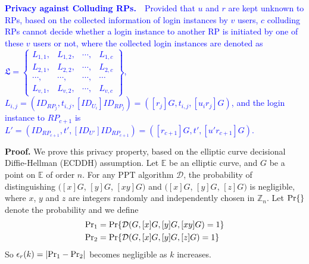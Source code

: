 {{\vspace{1mm}
\noindent\textcolor{blue}{\textbf{Privacy against Colluding RPs.}~~Provided that $u$ and $r$ are kept unknown to RPs,
based on the collected information of login instances by $v$ users,
$c$ colluding RPs cannot decide whether a login instance to another RP is initiated by one of these $v$ users or not,
    where
    the collected login instances are denoted as $\mathfrak{L}=\left\{ \begin{matrix}
L_{1,1}, & L_{1,2}, & \cdots, & L_{1,c}\\
L_{2,1}, & L_{2,2}, & \cdots, & L_{2,c}\\
\cdots, & \cdots, & \cdots, & \cdots\\
L_{v,1}, & L_{v,2}, & \cdots, & L_{v,c}
\end{matrix}\right\}$, $L_{i, j} = (ID_{RP_j}, t_{i, j}, [ID_{U_i}]{ID_{RP_j}}) = ([r_j]G, t_{i,j}, [u_ir_j]G)$,
    and the login instance to $RP_{c+1}$ is $L'=(ID_{RP_{c+1}}, t', [ID_{U'}]ID_{RP_{c+1}}) = ([r_{c+1}]G, t', [u'r_{c+1}]G)$.}


\vspace{0.75mm}
\noindent\textbf{Proof.}
We prove this privacy property,
 based on the elliptic curve decisional Diffie-Hellman (ECDDH) assumption. %
%
Let $\mathbb{E}$ be an elliptic curve,
    and $G$ be a point on $\mathbb{E}$ of order $n$.
For any PPT algorithm $\mathcal{D}$, the probability of distinguishing
 $([x]G$, $[y]G$, $[xy]G)$ and $([x]G$, $[y]G$, $[z]G)$
is negligible,
 where $x$, $y$ and $z$ are integers randomly and independently chosen in $\mathbb{Z}_n$.
Let  ${\rm Pr}\{\}$ denote the probability and
 we define
\begin{align*}
&{\rm Pr}_1 =  {\rm Pr}\{\mathcal{D}(G, [x]G, [y]G, [xy]G)=1\} \\
&{\rm Pr}_2 =  {\rm Pr}\{\mathcal{D}(G, [x]G, [y]G, [z]G)=1\}
\end{align*}
So $\epsilon_{r}(k) = |{\rm Pr}_1 - {\rm Pr}_2|$ becomes negligible as $k$ increases.

}}
